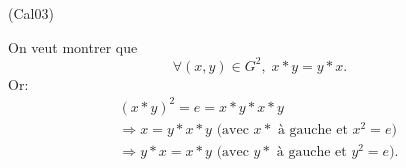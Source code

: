\begin{tiny}(Cal03)\end{tiny} On veut montrer que
\[
 \forall (x,y)\in G^2, \; x * y = y *x.
\]
Or:
\begin{multline*}
 (x*y)^2 = e = x * y * x * y \\
 \Rightarrow x = y * x * y \text{ (avec } x * \text{ à gauche et $x^2=e$) } \\
 \Rightarrow y * x =  x * y \text{ (avec } y * \text{ à gauche et $y^2 = e$).}
\end{multline*}

